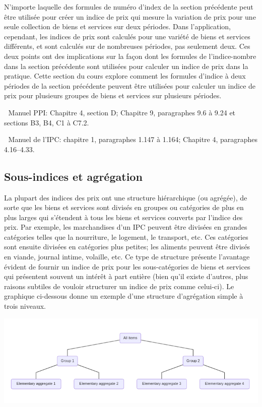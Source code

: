 \documentclass[]{article}
\begin{document}
N'importe laquelle des formules de numéro d'index de la section précédente peut être utilisée pour créer un indice de prix qui mesure la variation de prix pour une seule collection de biens et services sur deux périodes. Dans l'application, cependant, les indices de prix sont calculés pour une variété de biens et services différents, et sont calculés sur de nombreuses périodes, pas seulement deux. Ces deux points ont des implications sur la façon dont les formules de l'indice-nombre dans la section précédente sont utilisées pour calculer un indice de prix dans la pratique. Cette section du cours explore comment les formules d'indice à deux périodes de la section précédente peuvent être utilisées pour calculer un indice de prix pour plusieurs groupes de biens et services sur plusieurs périodes.

📖 Manuel PPI: Chapitre 4, section D; Chapitre 9, paragraphes 9.6 à 9.24 et sections B3, B4, C1 à C7.2.

📖 Manuel de l'IPC: chapitre 1, paragraphes 1.147 à 1.164; Chapitre 4, paragraphes 4.16--4.33.

\hypertarget{sous-indices-et-agruxe9gation}{%
\subsection{Sous-indices et agrégation}\label{sous-indices-et-agruxe9gation}}

La plupart des indices des prix ont une structure hiérarchique (ou agrégée), de sorte que les biens et services sont divisés en groupes ou catégories de plus en plus larges qui s'étendent à tous les biens et services couverts par l'indice des prix. Par exemple, les marchandises d'un IPC peuvent être divisées en grandes catégories telles que la nourriture, le logement, le transport, etc. Ces catégories sont ensuite divisées en catégories plus petites; les aliments peuvent être divisés en viande, journal intime, volaille, etc. Ce type de structure présente l'avantage évident de fournir un indice de prix pour les sous-catégories de biens et services qui présentent souvent un intérêt à part entière (bien qu'il existe d'autres, plus raisons subtiles de vouloir structurer un indice de prix comme celui-ci). Le graphique ci-dessous donne un exemple d'une structure d'agrégation simple à trois niveaux.

\includegraphics{img/plot1.png}
\end{document}
